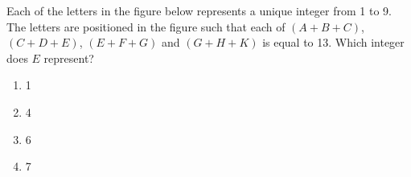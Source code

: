 \documentclass[journal]{IEEEtran}
\begin{document}
\begin{enumerate}
{           	Each of the letters in the figure below represents a unique integer from 1 to 9. The letters are positioned in the figure such that each of \((A+B+C)\), \((C+D+E)\), \((E+F+G)\) and \((G+H+K)\) is equal to 13. Which integer does \(E\) represent?
           	\begin{center}
           	\end{center}
           	\begin{multicols}{4}
           		
				\begin{enumerate}
					\item 1
					\item 4
					\item 6
					\item 7
				\end{enumerate}
			\end{multicols}

        
        }
   
    \end{enumerate}
\end{document}
